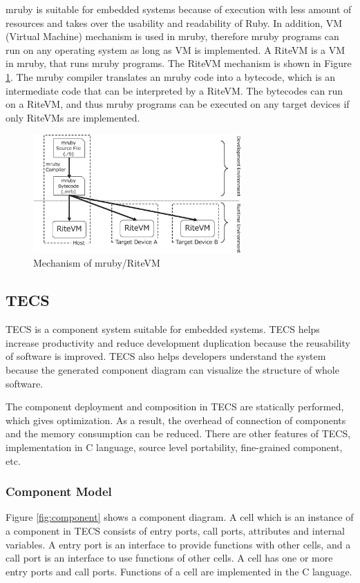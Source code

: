 \documentclass{sig-alternate-05-2015}
\begin{document}
mruby is suitable for embedded systems because of execution with less amount of resources and takes over the usability and readability of Ruby.
In addition, VM (Virtual Machine) mechanism is used in mruby, therefore mruby programs can run on any operating system as long as VM is implemented.
A RiteVM is a VM in mruby, that runs mruby programs.
The RiteVM mechanism is shown in Figure \ref{fig:mruby}.
The mruby compiler translates an mruby code into a bytecode, which is an intermediate code that can be interpreted by a RiteVM.
The bytecodes can run on a RiteVM, and thus mruby programs can be executed on any target devices if only RiteVMs are implemented.
\begin{figure}[t]
    \centering
    \includegraphics[width=8cm,clip]{figure/mruby.eps}
    \vspace{1mm}
    \caption{Mechanism of mruby/RiteVM}
    \vspace{1mm}
    \label{fig:mruby}
\end{figure}

\subsection{TECS}
\label{sec:TECS}
TECS is a component system suitable for embedded systems.
TECS helps increase productivity and reduce development duplication because the reusability of software is improved.
TECS also helps developers understand the system because the generated component diagram can visualize the structure of whole software.

The component deployment and composition in TECS are statically performed, which gives optimization.
As a result, the overhead of connection of components and the memory consumption can be reduced.
There are other features of TECS, implementation in C language, source level portability, fine-grained component, etc.

\subsubsection{Component Model}
Figure \ref{fig:component} shows a component diagram.
A {\myit cell} which is an instance of a component in TECS consists of {\myit entry} ports, {\myit call} ports, attributes and internal variables.
A {\myit entry} port is an interface to provide functions with other {\myit cell}s, and a {\myit call} port is an interface to use functions of other {\myit cell}s.
A {\myit cell} has one or more {\myit entry} ports and {\myit call} ports.
Functions of a {\myit cell} are implemented in the C language.
\end{document}
